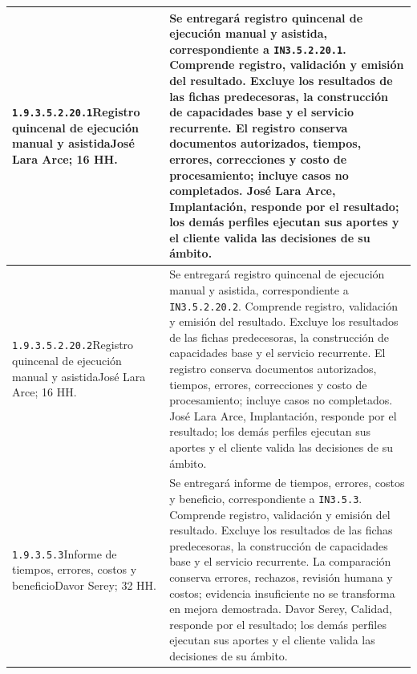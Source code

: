 \begin{longtable}{L{52mm}L{91mm}}
\texttt{1.\allowbreak{}9.\allowbreak{}3.\allowbreak{}5.\allowbreak{}2.\allowbreak{}20.\allowbreak{}1}\newline Registro quincenal de ejecución manual y asistida\newline José Lara Arce; 16 HH. & Se entregará registro quincenal de ejecución manual y asistida, correspondiente a \texttt{IN3.5.2.20.1}. Comprende registro, validación y emisión del resultado. Excluye los resultados de las fichas predecesoras, la construcción de capacidades base y el servicio recurrente.  El registro conserva documentos autorizados, tiempos, errores, correcciones y costo de procesamiento; incluye casos no completados. José Lara Arce, Implantación, responde por el resultado; los demás perfiles ejecutan sus aportes y el cliente valida las decisiones de su ámbito.\\\hline
\texttt{1.\allowbreak{}9.\allowbreak{}3.\allowbreak{}5.\allowbreak{}2.\allowbreak{}20.\allowbreak{}2}\newline Registro quincenal de ejecución manual y asistida\newline José Lara Arce; 16 HH. & Se entregará registro quincenal de ejecución manual y asistida, correspondiente a \texttt{IN3.5.2.20.2}. Comprende registro, validación y emisión del resultado. Excluye los resultados de las fichas predecesoras, la construcción de capacidades base y el servicio recurrente.  El registro conserva documentos autorizados, tiempos, errores, correcciones y costo de procesamiento; incluye casos no completados. José Lara Arce, Implantación, responde por el resultado; los demás perfiles ejecutan sus aportes y el cliente valida las decisiones de su ámbito.\\\hline
\texttt{1.\allowbreak{}9.\allowbreak{}3.\allowbreak{}5.\allowbreak{}3}\newline Informe de tiempos, errores, costos y beneficio\newline Davor Serey; 32 HH. & Se entregará informe de tiempos, errores, costos y beneficio, correspondiente a \texttt{IN3.5.3}. Comprende registro, validación y emisión del resultado. Excluye los resultados de las fichas predecesoras, la construcción de capacidades base y el servicio recurrente.  La comparación conserva errores, rechazos, revisión humana y costos; evidencia insuficiente no se transforma en mejora demostrada. Davor Serey, Calidad, responde por el resultado; los demás perfiles ejecutan sus aportes y el cliente valida las decisiones de su ámbito.\\\hline

\end{longtable}

